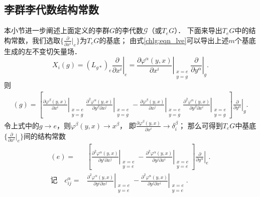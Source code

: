 

\subsection{李群李代数结构常数}\label{chlg:sec_structure-constants}
本小节进一步阐述上面定义的李群$G$的李代数$\mathscr{G}$（或$T_eG$）．
下面来导出$T_eG$中的结构常数，我们选取$\{\frac{\partial}{\partial x^i}|_{e}\}$为$T_eG$的基底；
由式\eqref{chlg:eqn_lve}可以导出上述$m$个基底生成的左不变切矢量场．
\begin{equation}
    X_i(g)=(L_{g*})_e \left.\frac{\partial }{\partial x^i}\right|_e 
    = \left. \frac{\partial \varphi^\alpha (y,x)}{\partial x^i} 
    \right|_{\substack{x=e\\y=g}}  \left. \frac{\partial}{\partial y^\alpha}\right|_{g} .
\end{equation}
则
\setlength{\mathindent}{0em}
\begin{align*}
    [X_i, X_j](g)= \left[ \left. \frac{\partial \varphi^\beta (y,x)}{\partial x^i} \right| _{\substack{x=e\\y=g}}
    \left. \frac{\partial^2 \varphi^\alpha (y,x)}{\partial y^\beta \partial x^j} \right|_{\substack{x=e\\y=g}} 
    -\left. \frac{\partial \varphi^\beta (y,x)}{\partial x^j} \right| _{\substack{x=e\\y=g}}
    \left. \frac{\partial^2 \varphi^\alpha (y,x)}{\partial y^\beta \partial x^i} \right|_{\substack{x=e\\y=g}} 
    \right] \left. \frac{\partial}{\partial y^\alpha}\right|_{g} .
\end{align*}\setlength{\mathindent}{2em}
令上式中的$g\to e$，则$\varphi^\beta(y,x) \to x^\beta$，
即$\frac{\partial \varphi^\beta (y,x)}{\partial x^i}\to \delta^\beta_i$；
那么可得到$T_eG$中基底$\{\frac{\partial}{\partial x^i}|_{e}\}$间的结构常数
\begin{align}
    [X_i, X_j](e)=& \left[ \left. \frac{\partial^2 \varphi^\alpha (y,x)}{\partial y^i \partial x^j} \right|_{\substack{x=e\\y=e}} 
    -\left. \frac{\partial^2 \varphi^\alpha (y,x)}{\partial y^j \partial x^i} \right|_{\substack{x=e\\y=e}} 
    \right] \left. \frac{\partial}{\partial y^\alpha}\right|_{e} . \\
    \text{记}\quad 
    c^\alpha_{ij}=&\left. \frac{\partial^2 \varphi^\alpha (y,x)}{\partial y^i \partial x^j} \right|_{\substack{x=e\\y=e}} -\left. 
    \frac{\partial^2 \varphi^\alpha (y,x)}{\partial y^j \partial x^i} \right|_{\substack{x=e\\y=e}} . \label{chlg:eqn_struc-const}
\end{align}


